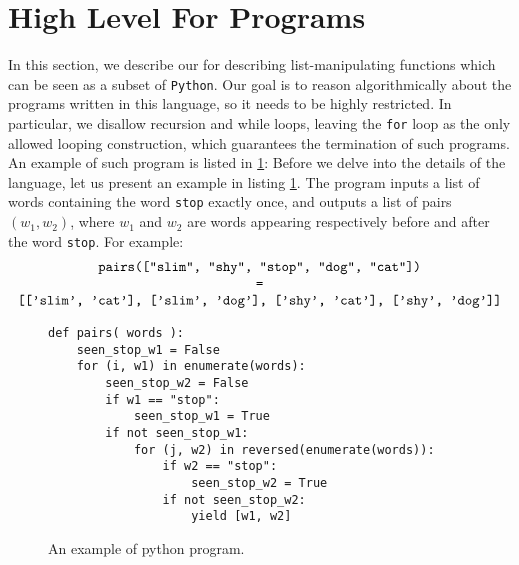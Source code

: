 \section{High Level For Programs}
\label{sec:high_level}

\AP In this section, we describe our  for describing
list-manipulating functions which can be seen as a subset of \texttt{Python}.
Our goal is to reason algorithmically about the programs written in this language,
so it needs to be highly restricted. In particular, we disallow recursion and
while loops, leaving the \texttt{for} loop as the only allowed looping
construction, which guarantees the termination of such programs.
An example of such program is listed in \cref{fig:python-example}: 
Before we delve into the details of the language, let us present 
an example in listing \ref{fig:python-example}. The program inputs
a list of words containing the word \texttt{stop} exactly once,
and outputs a list of pairs $(w_1, w_2)$, where $w_1$ and $w_2$ are words
appearing respectively before and after the word \texttt{stop}. For example:
\[
\begin{tabular}{c}
    \texttt{pairs(["slim", "shy", "stop", "dog", "cat"])} \\
    \texttt{=} \\
    \texttt{[['slim', 'cat'], ['slim', 'dog'], ['shy', 'cat'], ['shy', 'dog']]}
\end{tabular}
\] 
\begin{figure}[h]
\begin{verbatim}
def pairs( words ):
    seen_stop_w1 = False
    for (i, w1) in enumerate(words):
        seen_stop_w2 = False
        if w1 == "stop":
            seen_stop_w1 = True
        if not seen_stop_w1:
            for (j, w2) in reversed(enumerate(words)):
                if w2 == "stop":
                    seen_stop_w2 = True
                if not seen_stop_w2:
                    yield [w1, w2]
\end{verbatim}
\caption{An example of python program.}
\label{fig:python-example}
\end{figure}


